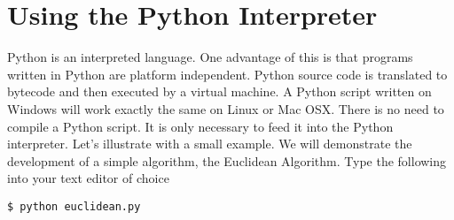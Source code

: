 \section*{Using the Python Interpreter}
Python is an interpreted language.  One advantage of this is that programs written in Python are platform independent.  Python source code is translated to bytecode and then executed by a virtual machine.  A Python script written on Windows will work exactly the same on Linux or Mac OSX.  There is no need to compile a Python script.  It is only necessary to feed it into the Python interpreter.  Let's illustrate with a small example.  We will demonstrate the development of a simple algorithm, the Euclidean Algorithm.  Type the following into your text editor of choice


\begin{lstlisting}
$ python euclidean.py
\end{lstlisting}

